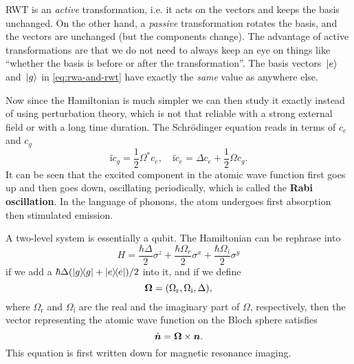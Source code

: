 \documentclass[hyperref, a4paper]{article}
\newcommand*{\ii}{\mathrm{i}}
\newcommand*{\concept}[1]{{\textbf{#1}}}
\begin{document}
\begin{note*}{}
    RWT is an \emph{active} transformation, i.e. it acts on the vectors and keeps the basis unchanged.
    On the other hand, a \emph{passive} transformation rotates the basis, and the vectors are unchanged 
    (but the components change). The advantage of active transformations are that we do not need to always 
    keep an eye on things like ``whether the basis is before or after the transformation''. The basis 
    vectors $\ket*{e}$ and $\ket*{g}$ in \eqref{eq:rwa-and-rwt} have exactly the \emph{same} value as 
    anywhere else. 
\end{note*}

Now since the Hamiltonian is much simpler we can then study it exactly instead of using perturbation theory, 
which is not that reliable with a strong external field or with a long time duration.
The Schrödinger equation reads in terms of $c_e$ and $c_g$
\begin{equation}
    \ii \dot{c}_g = \frac{1}{2} \Omega^* c_e, \quad \ii \dot{c}_e = \Delta c_e + \frac{1}{2} \Omega c_g.
\end{equation}
It can be seen that the excited component in the atomic wave function first goes up and then goes down, oscillating periodically,
which is called the \concept{Rabi oscillation}. 
In the language of phonons, the atom undergoes first absorption then stimulated emission.

A two-level system is essentially a qubit. The Hamiltonian can be rephrase into 
\begin{equation}
    H = \frac{\hbar \Delta}{2} \sigma^z + \frac{\hbar \Omega_r}{2} \sigma^x + \frac{\hbar \Omega_i}{2} \sigma^y 
\end{equation}
if we add a $\hbar \Delta (\dyad{g} + \dyad{e}) / 2$ into it, and if we define 
\begin{equation}
    \vb*{\Omega} = (\Omega_\text{r}, \Omega_\text{i}, \Delta),
\end{equation}
where $\Omega_\text{r}$ and $\Omega_\text{i}$ are the real and the imaginary part of $\Omega$, respectively, 
then the vector representing the atomic wave function on the Bloch sphere satisfies 
\begin{equation}
    \dot{\vb*{n}} = \vb*{\Omega} \times \vb*{n}.
\end{equation}
This equation is first written down for magnetic resonance imaging.
\end{document}
